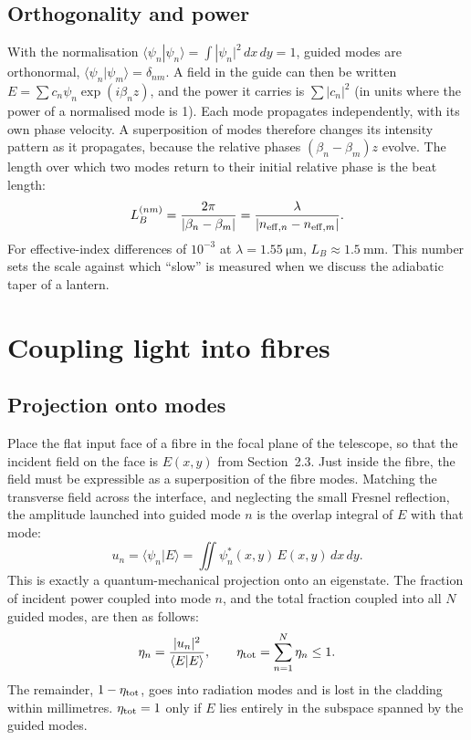 \documentclass[11pt,a4paper]{article}
\newcommand{\braket}[2]{\langle #1|#2\rangle}
\begin{document}
\subsection{Orthogonality and power}
With the normalisation $\braket{\psi_n}{\psi_n} = \int |\psi_n|^2\,dx\,dy = 1$, guided modes are orthonormal, $\braket{\psi_n}{\psi_m} = \delta_{nm}$. A field in the guide can then be written $E = \sum c_n \psi_n \exp(i\beta_n z)$, and the power it carries is $\sum |c_n|^2$ (in units where the power of a normalised mode is 1). Each mode propagates independently, with its own phase velocity. A superposition of modes therefore changes its intensity pattern as it propagates, because the relative phases $(\beta_n - \beta_m)z$ evolve. The length over which two modes return to their initial relative phase is the beat length:
\begin{equation}
L_B^{(nm)} = \frac{2\pi}{|\beta_n - \beta_m|} = \frac{\lambda}{|n_{{\rm eff},n} - n_{{\rm eff},m}|}.
\label{eq:beat}
\end{equation}
For effective-index differences of $10^{-3}$ at $\lambda = \SI{1.55}{\micro\meter}$, $L_B \approx \SI{1.5}{\milli\meter}$. This number sets the scale against which ``slow'' is measured when we discuss the adiabatic taper of a lantern.

\section{Coupling light into fibres}

\subsection{Projection onto modes}
Place the flat input face of a fibre in the focal plane of the telescope, so that the incident field on the face is $E(x,y)$ from Section~2.3. Just inside the fibre, the field must be expressible as a superposition of the fibre modes. Matching the transverse field across the interface, and neglecting the small Fresnel reflection, the amplitude launched into guided mode $n$ is the overlap integral of $E$ with that mode:
\begin{equation}
u_n = \braket{\psi_n}{E} = \iint \psi_n^*(x,y)\, E(x,y)\, dx\, dy.
\label{eq:overlap}
\end{equation}
This is exactly a quantum-mechanical projection onto an eigenstate. The fraction of incident power coupled into mode $n$, and the total fraction coupled into all $N$ guided modes, are then as follows:
\begin{equation}
\eta_n = \frac{|u_n|^2}{\braket{E}{E}},
\qquad
\eta_{\rm tot} = \sum_{n=1}^{N} \eta_n \le 1.
\label{eq:efficiency}
\end{equation}
The remainder, $1 - \eta_{\rm tot}$, goes into radiation modes and is lost in the cladding within millimetres. $\eta_{\rm tot} = 1$ only if $E$ lies entirely in the subspace spanned by the guided modes.
\end{document}

